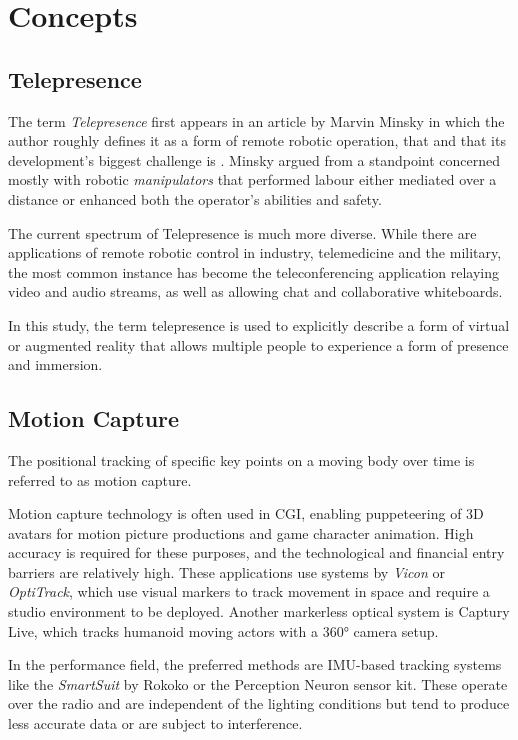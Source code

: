\chapter{Concepts}

\section{Telepresence}

The term \emph{Telepresence} first appears in an article by Marvin Minsky in which the author roughly defines it as a form of remote robotic operation, that  and that its development's biggest challenge is  \parencite{minskyTelepresence}. Minsky argued from a standpoint concerned mostly with robotic \emph{manipulators} that performed labour either mediated over a distance or enhanced both the operator's abilities and safety.

The current spectrum of Telepresence is much more diverse. While there are applications of remote robotic control in industry, telemedicine and the military, the most common instance has become the teleconferencing application relaying video and audio streams, as well as allowing chat and collaborative whiteboards.
	
In this study, the term telepresence is used to explicitly describe a form of virtual or augmented reality that allows multiple people to experience a form of presence and immersion.

\section{Motion Capture}

The positional tracking of specific key points on a moving body over time is referred to as motion capture.

Motion capture technology is often used in CGI, enabling puppeteering of 3D avatars for motion picture productions and game character animation. High accuracy is required for these purposes, and the technological and financial entry barriers are relatively high. These applications use systems by \emph{Vicon} or \emph{OptiTrack}, which use visual markers to track movement in space and require a studio environment to be deployed. Another markerless optical system is Captury Live, which tracks humanoid moving actors with a 360° camera setup.

In the performance field, the preferred methods are IMU-based tracking systems like the \emph{SmartSuit} by Rokoko or the Perception Neuron sensor kit. These operate over the radio and are independent of the lighting conditions but tend to produce less accurate data or are subject to interference.

